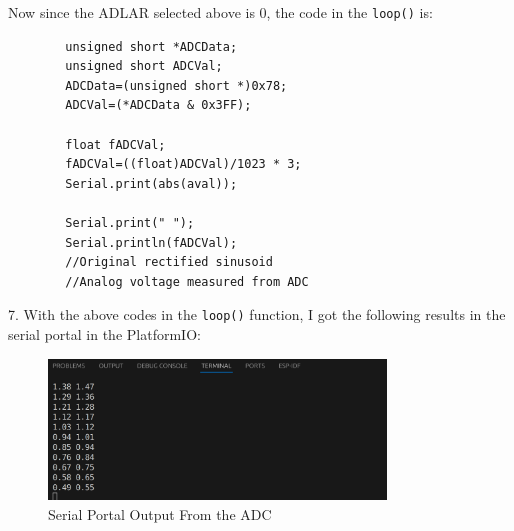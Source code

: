 \documentclass{report}
\begin{document}
    Now since the ADLAR selected above is 0, the code in the \texttt{loop()} is:
    \begin{verbatim}
        unsigned short *ADCData;
        unsigned short ADCVal;
        ADCData=(unsigned short *)0x78;
        ADCVal=(*ADCData & 0x3FF);

        float fADCVal;
        fADCVal=((float)ADCVal)/1023 * 3;
        Serial.print(abs(aval));

        Serial.print(" ");
        Serial.println(fADCVal);
        //Original rectified sinusoid
        //Analog voltage measured from ADC
    \end{verbatim}
    7. With the above codes in the \texttt{loop()} function, I got the following results in the serial portal in the PlatformIO:
    \begin{figure}[H]
        \centering
        \includegraphics[width = 0.8\textwidth]{scope5.png}
        \caption{Serial Portal Output From the ADC}
    \end{figure}
\end{document}

